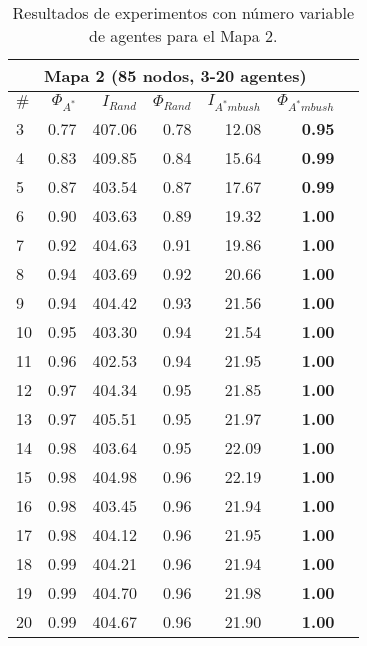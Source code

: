 \begin{table}[htb]
\begin{center}
\begin{tabular}{|l|r|r|r|r|r|r|}
\hline
\multicolumn{6}{|c|}{\textbf{Mapa 2 (85 nodos, 3-20 agentes)}}\\
\hline
$\#$ & $\Phi_{A^*}$ & $I_{Rand}$ & $\Phi_{Rand}$
& $I_{A^*mbush}$ & $\Phi_{A^*mbush}$\\
\hline
 3 & 0.77 & 407.06 & 0.78 & 12.08 & \textbf{0.95}\\
 4 & 0.83 & 409.85 & 0.84 & 15.64 & \textbf{0.99}\\
 5 & 0.87 & 403.54 & 0.87 & 17.67 & \textbf{0.99}\\
 6 & 0.90 & 403.63 & 0.89 & 19.32 & \textbf{1.00}\\
 7 & 0.92 & 404.63 & 0.91 & 19.86 & \textbf{1.00}\\
 8 & 0.94 & 403.69 & 0.92 & 20.66 & \textbf{1.00}\\
 9 & 0.94 & 404.42 & 0.93 & 21.56 & \textbf{1.00}\\
10 & 0.95 & 403.30 & 0.94 & 21.54 & \textbf{1.00}\\
11 & 0.96 & 402.53 & 0.94 & 21.95 & \textbf{1.00}\\
12 & 0.97 & 404.34 & 0.95 & 21.85 & \textbf{1.00}\\
13 & 0.97 & 405.51 & 0.95 & 21.97 & \textbf{1.00}\\
14 & 0.98 & 403.64 & 0.95 & 22.09 & \textbf{1.00}\\
15 & 0.98 & 404.98 & 0.96 & 22.19 & \textbf{1.00}\\
16 & 0.98 & 403.45 & 0.96 & 21.94 & \textbf{1.00}\\
17 & 0.98 & 404.12 & 0.96 & 21.95 & \textbf{1.00}\\
18 & 0.99 & 404.21 & 0.96 & 21.94 & \textbf{1.00}\\
19 & 0.99 & 404.70 & 0.96 & 21.98 & \textbf{1.00}\\
20 & 0.99 & 404.67 & 0.96 & 21.90 & \textbf{1.00}\\
\hline
\end{tabular}
\end{center}
	\caption{\label{tab:g1}
	     Resultados de experimentos con número variable de agentes
	     para el Mapa 2.}
\end{table}